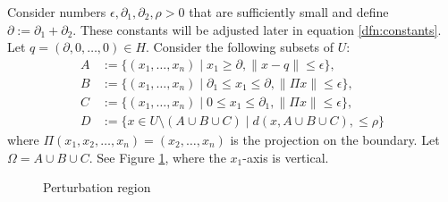 \documentclass{CUP-JNL-FMP}%
\theoremstyle{definition}
\numberwithin{equation}{section}
\begin{document}
Consider numbers
$\epsilon, \partial_1, \partial_2, \rho > 0$ that are sufficiently small and define
$\partial:=\partial_1 + \partial_2$. These constants will be adjusted later in equation \eqref{dfn:constants}.
Let $q = (\partial, 0, \dots, 0)\in H$. Consider the following subsets of $U$:
\begin{align*}
  A &:= \big\{(x_1, \dots, x_n) \mid  x_1 \geq \partial, \|x - q\| \leq \epsilon\big\}, \\
  B &:= \big\{(x_1, \dots, x_n) \mid  \partial_1 \leq x_1 \leq \partial,
      \|\Pi x\| \leq \epsilon\big\}, \\
  C &:= \big\{(x_1, \dots, x_n) \mid  0 \leq x_1 \leq \partial_1,
      \|\Pi x\| \leq \epsilon\big\}, \\
  D &:= \big\{x \in U \setminus (A \cup B \cup C) \mid  d(x,A \cup B \cup C),
      \leq \rho\big\}
\end{align*}
where $\Pi(x_1, x_2, \dots, x_n) = (x_2, \dots, x_n)$ is the projection
on the boundary. Let $\Omega = A \cup B \cup C$. See Figure \ref{fig:domain}, where the $x_1$-axis is vertical.
\begin{figure}[h]
{\caption{Perturbation region}\label{fig:domain}}
\end{figure}
\end{document}
